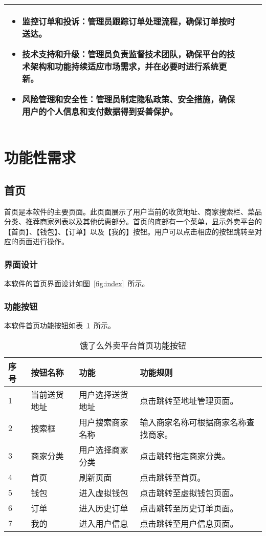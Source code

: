\begin{table}[htbp]
\begin{tabularx}{\textwidth}{llX}
\begin{itemize}
    \item{\textbf{监控订单和投诉}}：管理员跟踪订单处理流程，确保订单按时送达。
    \item{\textbf{技术支持和升级}}：管理员负责监督技术团队，确保平台的技术架构和功能持续适应市场需求，并在必要时进行系统更新。
    \item {\textbf{风险管理和安全性}}：管理员制定隐私政策、安全措施，确保用户的个人信息和支付数据得到妥善保护。
\end{itemize}
\\
\bottomrule[1.5pt]
\end{tabularx}
\vspace{\baselineskip}
\end{table}

\section{功能性需求}
\subsection{首页}
首页是本软件的主要页面。此页面展示了用户当前的收货地址、商家搜索栏、菜品分类、推荐商家列表以及其他优惠部分。首页的底部有一个菜单，显示外卖平台的【首页】、【钱包】、【订单】以及【我的】按钮。用户可以点击相应的按钮跳转至对应的页面进行操作。
\subsubsection{界面设计}
本软件的首页界面设计如图~\ref{fig:index}~所示。
\subsubsection{功能按钮}
本软件首页功能按钮如表~\ref{tab:table2}~所示。
\begin{table}[htbp]
    \caption{饿了么外卖平台首页功能按钮}\label{tab:table2}
    \vspace{0.5em}\wuhao
    \begin{tabularx}{\textwidth}{lllX}
    \toprule[1.5pt]
    序号 & 按钮名称 & 功能 & 功能规则 \\ 
    \midrule[1pt]
    1 & 当前送货地址 & 用户选择送货地址 & 点击跳转至地址管理页面。 \\
    2 & 搜索框 & 用户搜索商家名称 & 输入商家名称可根据商家名称查找商家。 \\
    3 & 商家分类 & 用户选择商家分类 & 点击跳转指定商家分类。 \\
    4 & 首页 & 刷新页面 & 点击跳转至首页。 \\
    5 & 钱包 & 进入虚拟钱包 & 点击跳转至虚拟钱包页面。 \\
    6 & 订单 & 进入历史订单 & 点击跳转至历史订单页面。 \\
    7 & 我的 & 进入用户信息 & 点击跳转至用户信息页面。 \\
\bottomrule[1.5pt]
\end{tabularx}
\vspace{\baselineskip}
\end{table}

